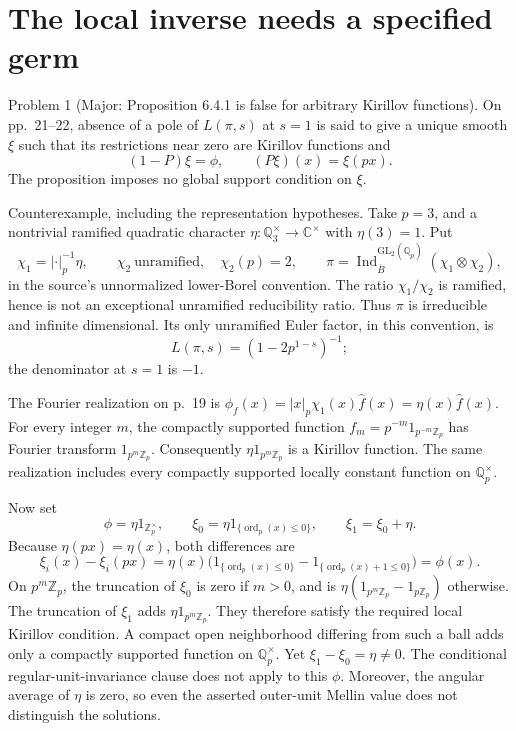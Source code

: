 \documentclass[10pt]{article}
\begin{document}
\section*{The local inverse needs a specified germ}
Problem 1 (Major: Proposition 6.4.1 is false for arbitrary Kirillov functions).  On pp. 21–22, absence of a pole of \(L(\pi,s)\) at \(s=1\) is said to give a unique smooth \(\xi\) such that its restrictions near zero are Kirillov functions and \[(1-P)\xi=\phi,\qquad (P\xi)(x)=\xi(px).\] The proposition imposes no global support condition on \(\xi\).\par
Counterexample, including the representation hypotheses. Take \(p=3\), and a nontrivial ramified quadratic character \(\eta:\mathbb Q_3^\times\to\mathbb C^\times\) with \(\eta(3)=1\). Put \[\chi_1=|\cdot|_p^{-1}\eta,\qquad
 \chi_2\ \text{unramified},\quad\chi_2(p)=2,\qquad
 \pi=\operatorname{Ind}_{\overline B}^{\mathrm{GL}_2(\mathbb Q_p)}(\chi_1\otimes\chi_2),\] in the source’s unnormalized lower-Borel convention. The ratio \(\chi_1/\chi_2\) is ramified, hence is not an exceptional unramified reducibility ratio. Thus \(\pi\) is irreducible and infinite dimensional. Its only unramified Euler factor, in this convention, is \[L(\pi,s)=(1-2p^{1-s})^{-1};\] the denominator at \(s=1\) is \(-1\).\par
The Fourier realization on p. 19 is \(\phi_f(x)=|x|_p\chi_1(x)\widehat f(x)=\eta(x)\widehat f(x)\). For every integer \(m\), the compactly supported function \(f_m=p^{-m}1_{p^{-m}\mathbb Z_p}\) has Fourier transform \(1_{p^m\mathbb Z_p}\). Consequently \(\eta1_{p^m\mathbb Z_p}\) is a Kirillov function. The same realization includes every compactly supported locally constant function on \(\mathbb Q_p^\times\).\par
Now set \[\phi=\eta1_{\mathbb Z_p^\times},\qquad
 \xi_0=\eta1_{\{\operatorname{ord}_p(x)\leq0\}},\qquad
 \xi_1=\xi_0+\eta.\] Because \(\eta(px)=\eta(x)\), both differences are \[\xi_i(x)-\xi_i(px)
 =\eta(x)\bigl(1_{\{\operatorname{ord}_p(x)\leq0\}}-
                   1_{\{\operatorname{ord}_p(x)+1\leq0\}}\bigr)=\phi(x).\] On \(p^m\mathbb Z_p\), the truncation of \(\xi_0\) is zero if \(m>0\), and is \(\eta(1_{p^m\mathbb Z_p}-1_{p\mathbb Z_p})\) otherwise. The truncation of \(\xi_1\) adds \(\eta1_{p^m\mathbb Z_p}\). They therefore satisfy the required local Kirillov condition. A compact open neighborhood differing from such a ball adds only a compactly supported function on \(\mathbb Q_p^\times\). Yet \(\xi_1-\xi_0=\eta\ne0\). The conditional regular-unit-invariance clause does not apply to this \(\phi\). Moreover, the angular average of \(\eta\) is zero, so even the asserted outer-unit Mellin value does not distinguish the solutions.\par
\end{document}
